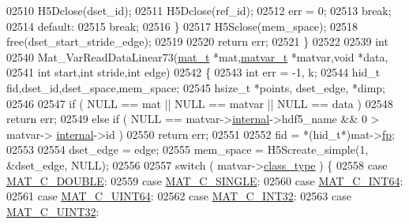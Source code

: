 \begin{DoxyCode}
{{{{{{{{{{02510             H5Dclose(dset\_id);
02511             H5Dclose(ref\_id);
02512             err = 0;
02513             \textcolor{keywordflow}{break};
02514         \textcolor{keywordflow}{default}:
02515             \textcolor{keywordflow}{break};
02516     \}
02517     H5Sclose(mem\_space);
02518     free(dset\_start\_stride\_edge);
02519 
02520     \textcolor{keywordflow}{return} err;
02521 \}
02522 
02539 \textcolor{keywordtype}{int}
02540 Mat\_VarReadDataLinear73(\hyperlink{struct__mat__t}{mat\_t} *mat,\hyperlink{group___m_a_t_structmatvar__t}{matvar\_t} *matvar,\textcolor{keywordtype}{void} *data,
02541     \textcolor{keywordtype}{int} start,\textcolor{keywordtype}{int} stride,\textcolor{keywordtype}{int} edge)
02542 \{
02543     \textcolor{keywordtype}{int} err = -1, k;
02544     hid\_t fid,dset\_id,dset\_space,mem\_space;
02545     hsize\_t *points, dset\_edge, *dimp;
02546 
02547     \textcolor{keywordflow}{if} ( NULL == mat || NULL == matvar || NULL == data )
02548         \textcolor{keywordflow}{return} err;
02549     \textcolor{keywordflow}{else} \textcolor{keywordflow}{if} ( NULL == matvar->\hyperlink{group___m_a_t_a6e97e3ed9f40c49322c18561c2a94e92}{internal}->hdf5\_name && 0 > matvar->
      \hyperlink{group___m_a_t_a6e97e3ed9f40c49322c18561c2a94e92}{internal}->id )
02550         \textcolor{keywordflow}{return} err;
02551 
02552     fid = *(hid\_t*)mat->\hyperlink{struct__mat__t_a85f562e407ca9ad4d2a6e14f839432b7}{fp};
02553 
02554     dset\_edge = edge;
02555     mem\_space = H5Screate\_simple(1, &dset\_edge, NULL);
02556 
02557     \textcolor{keywordflow}{switch} ( matvar->\hyperlink{group___m_a_t_aff13035bf3265dd7d9425e5d40c839d4}{class\_type} ) \{
02558         \textcolor{keywordflow}{case} \hyperlink{group___m_a_t_ggad4d60ae7b709fc81bfd744fb4c857c40a5d70e0862e5bdb7bd86bf7ba5948f307}{MAT\_C\_DOUBLE}:
02559         \textcolor{keywordflow}{case} \hyperlink{group___m_a_t_ggad4d60ae7b709fc81bfd744fb4c857c40a2825631e26a961cbe0f79db50a39cea2}{MAT\_C\_SINGLE}:
02560         \textcolor{keywordflow}{case} \hyperlink{group___m_a_t_ggad4d60ae7b709fc81bfd744fb4c857c40a1ea83bcde49b35477494412973f82409}{MAT\_C\_INT64}:
02561         \textcolor{keywordflow}{case} \hyperlink{group___m_a_t_ggad4d60ae7b709fc81bfd744fb4c857c40a86470e25c3763d9a24623f04326195dd}{MAT\_C\_UINT64}:
02562         \textcolor{keywordflow}{case} \hyperlink{group___m_a_t_ggad4d60ae7b709fc81bfd744fb4c857c40adb44fc39694e3152ae5e69470a2fefe8}{MAT\_C\_INT32}:
02563         \textcolor{keywordflow}{case} \hyperlink{group___m_a_t_ggad4d60ae7b709fc81bfd744fb4c857c40a9a17a7edd45b19ef68197db81b27e816}{MAT\_C\_UINT32}:
}}}}}}}}}}
\end{DoxyCode}
